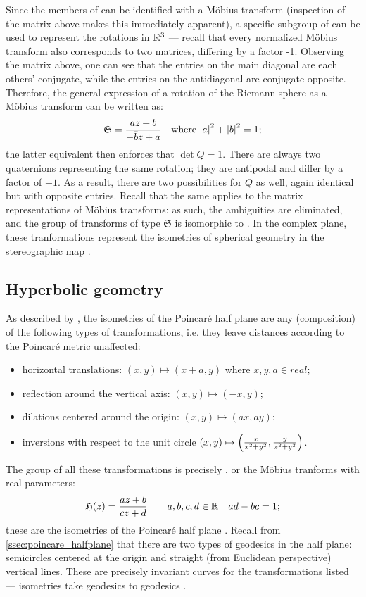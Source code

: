 Since the members of  can be identified with a Möbius transform (inspection of the matrix above makes this immediately apparent), a specific subgroup of \moebiusgroup can be used to represent the rotations in \(\mathbb{R}^3\) --- recall that every normalized Möbius transform also corresponds to two matrices, differing by a factor -1. Observing the matrix above, one can see that the entries on the main diagonal are each others' conjugate, while the entries on the antidiagonal are conjugate opposite. Therefore, the general expression of a rotation of the Riemann sphere as a Möbius transform can be written as: \cite{Needham2021}
\[\mathfrak{S} = \frac{az + b}{-\bar{b}z+\bar{a}}\quad\text{where } \abs{a}^2 + \abs{b}^2 = 1; \]
the latter equivalent then enforces that \(\det Q = 1\). There are always two quaternions representing the same rotation; they are antipodal and differ by a factor of \(-1\). As a result, there are two possibilities for \(Q\) as well, again identical but with opposite entries. Recall that the same applies to the matrix representations of Möbius transforms: as such, the ambiguities are eliminated, and the group of transforms of type \(\mathfrak{S}\) is isomorphic to \sogroup. In the complex plane, these tranformations represent the isometries of spherical geometry in the stereographic map \cite{Needham1997}. 


\subsection{Hyperbolic geometry}
As described by \citet{Rovenski2010}, the isometries of the Poincaré half plane are any (composition) of the following types of transformations, i.e. they leave distances according to the Poincaré metric unaffected:
\begin{itemize}
    \item horizontal translations: \((x, y)\mapsto(x + a, y)\) where \(x, y, a \in real\);
    \item reflection around the vertical axis: \((x, y) \mapsto (-x, y)\);
    \item dilations centered around the origin: \((x, y) \mapsto (ax, ay)\);
    \item inversions with respect to the unit circle \((x, y)\mapsto\qty(\frac{x}{x^2 + y^2}, \frac{y}{x^2 + y^2})\).
\end{itemize}
The group of all these transformations is precisely , or the Möbius tranforms with real parameters:
\[\mathfrak{H}(z) = \frac{az + b}{cz + d}\qquad a, b, c, d \in \mathbb{R} \quad ad - bc = 1;\]
these are the isometries of the Poincaré half plane \cite{Needham2021}. Recall from \cref{ssec:poincare_halfplane} that there are two types of geodesics in the half plane: semicircles centered at the origin and straight (from Euclidean perspective) vertical lines. These are precisely invariant curves for the transformations listed --- isometries take geodesics to geodesics \cite{Lee1997}.

